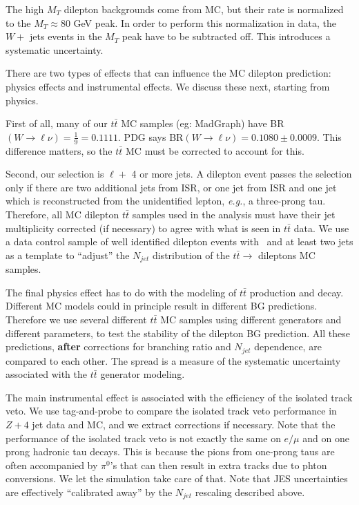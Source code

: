The high $M_T$ dilepton backgrounds come from MC, but their rate is normalized to the 
$M_T \approx 80$ GeV peak.  In order to perform this normalization in data, the $W +$ jets
events in the $M_T$ peak have to be subtracted off.  This introduces a systematic uncertainty.

There are two types of effects that can influence the MC dilepton prediction: physics effects 
and instrumental effects.  We discuss these next, starting from physics.

First of all, many of our $t\bar{t}$ MC samples (eg: MadGraph) have
 BR$(W \to \ell \nu)=\frac{1}{9} = 0.1111$.
PDG says BR$(W \to \ell \nu) = 0.1080 \pm 0.0009$.  This difference matters, so the $t\bar{t}$ MC 
must be corrected to account for this.

Second, our selection is $\ell +$ 4 or more jets.  A dilepton event passes the selection only if there are 
two additional jets from ISR, or one jet from ISR and one jet which is reconstructed from the 
unidentified lepton, {\it e.g.}, a three-prong tau.  Therefore, all MC dilepton $t\bar{t}$ samples used
in the analysis must have their jet multiplicity corrected (if necessary) to agree with what is 
seen in $t\bar{t}$ data.  We use a data control sample of well identified dilepton events with
\met\ and at least two jets as a template to ``adjust'' the $N_{jet}$ distribution of the $t\bar{t} \to$
dileptons MC samples.

The final physics effect has to do with the modeling of $t\bar{t}$ production and decay.  Different
MC models could in principle result in different BG predictions.  Therefore we use several different 
$t\bar{t}$ MC samples using different generators and different parameters, to test the stability
of the dilepton BG prediction.  All these predictions, {\bf after} corrections for branching ratio
and $N_{jet}$ dependence, are compared to each other.  The spread is a measure of the systematic
uncertainty associated with the $t\bar{t}$ generator modeling.

The main instrumental effect is associated with the efficiency of the isolated track veto.
We use tag-and-probe to compare the isolated track veto performance in $Z + 4$ jet data and 
MC, and we extract corrections if necessary.  Note that the performance of the isolated track veto 
is not exactly the same on $e/\mu$ and on one prong hadronic tau decays.  This is because
the pions from one-prong taus are often accompanied by $\pi^0$'s that can then result in extra 
tracks due to phton conversions.  We let the simulation take care of that.  
Note that JES uncertainties are effectively ``calibrated away'' by the $N_{jet}$ rescaling described above.  

